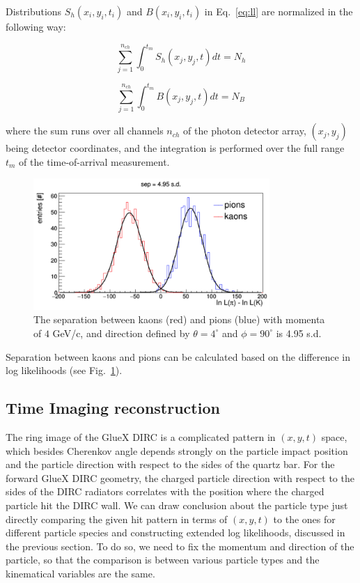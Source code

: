 \documentclass[11pt, a4paper]{article}
\begin{document}
Distributions $S_{h} (x_{i}, y_{i}, t_{i})$ and $B(x_{i}, y_{i}, t_{i})$ in Eq.~\ref{eq:ll} are normalized in the following way:

\begin{equation}
\sum_{j=1}^{n_{ch}} \int_{0}^{t_{m}} S_{h}(x_{j}, y_{j}, t) dt = N_{h}
\label{eq:norm1}
\end{equation}

\begin{equation}
\sum_{j=1}^{n_{ch}} \int_{0}^{t_{m}} B(x_{j}, y_{j}, t) dt = N_{B}
\label{eq:norm2}
\end{equation}

\noindent where the sum runs over all channels $n_{ch}$ of the photon detector array, $(x_{j}, y_{j})$ being detector coordinates, and the integration is performed over the full range $t_{m}$ of the time-of-arrival measurement.

\begin{figure}[!h]
\centering
\includegraphics[width=0.8\textwidth]{pics/sepLUT.png}
\caption{\label{pic:sepLUT}
The separation between kaons (red) and pions (blue) with momenta of $4$ GeV/c, and direction defined by $\theta = 4^{\circ}$ and $\phi = 90^{\circ}$ is 4.95 s.d.
}
\end{figure}

Separation between kaons and pions can be calculated based on the difference in log likelihoods (see Fig.~\ref{pic:sepLUT}).

\subsection{Time Imaging reconstruction}
\label{sec:ti}

The ring image of the GlueX DIRC is a complicated pattern in $(x, y, t)$ space, which besides Cherenkov angle depends strongly on the particle impact position and the particle direction with respect to the sides of the quartz bar. For the forward GlueX DIRC geometry, the charged particle direction with respect to the sides of the DIRC radiators correlates with the position where the charged particle hit the DIRC wall. We can draw conclusion about the particle type just directly comparing the given hit pattern in terms of $(x, y, t)$ to the ones for different particle species and constructing extended log likelihoods, discussed in the previous section. To do so, we need to fix the momentum and direction of the particle, so that the comparison is between various particle types and the kinematical variables are the same.
\end{document}
